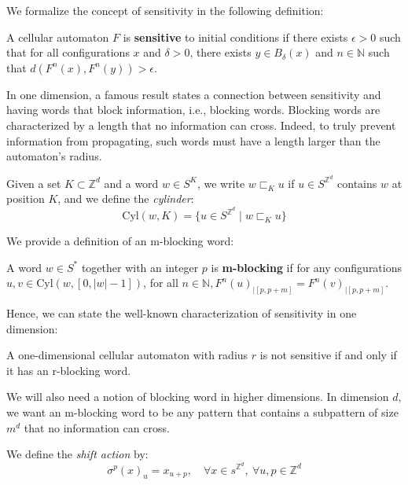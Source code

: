 \documentclass{llncs}
\begin{document}
We formalize the concept of sensitivity in the following definition:

\begin{definition}[Sensitivity]
A cellular automaton $F$ is \textbf{sensitive} to initial conditions if there exists $\epsilon > 0$ such that for all configurations $x$ and $\delta > 0$, there exists $y \in B_\delta(x)$ and $n \in \mathbb{N}$ such that $d(F^n(x), F^n(y)) > \epsilon$.
\end{definition}

In one dimension, a famous result states a connection between sensitivity and having words that block information, i.e., blocking words. Blocking words are characterized by a length that no information can cross. Indeed, to truly prevent information from propagating, such words must have a length larger than the automaton's radius. 

Given a set $K \subset \mathbb{Z}^d$ and a word $w \in S^K$, we write $w \sqsubset_K u$ if $u \in S^{\mathbb{Z}^d}$ contains $w$ at position $K$, and we define the \emph{cylinder}: 
\begin{equation}
\text{Cyl}(w, K) = \{ u \in S^{\mathbb{Z}^d} \mid w \sqsubset_K u \}
\end{equation}

We provide a definition of an m-blocking word:

\begin{definition}
A word $w \in S^*$ together with an integer $p$ is \textbf{m-blocking} if for any configurations $u, v \in \text{Cyl}(w, [0, |w|-1])$, for all $n \in \mathbb{N}, F^n(u)_{|[p,p+m]} = F^n(v)_{|[p,p+m]}$.
\end{definition}
Hence, we can state the well-known characterization of sensitivity in one dimension:

\begin{theorem}
A one-dimensional cellular automaton with radius $r$ is not sensitive if and only if it has an r-blocking word.\end{theorem}

We will also need a notion of blocking word in higher dimensions. In dimension $d$, we want an m-blocking word to be any pattern that contains a subpattern of size $m^d$ that no information can cross.

We define the \emph{shift action} by:\begin{equation}
\sigma^p(x)_u = x_{u+p}, \quad \forall x \in s^{\mathbb Z^d}, \ \forall u, p \in \mathbb Z^d 
\end{equation}
\end{document}
